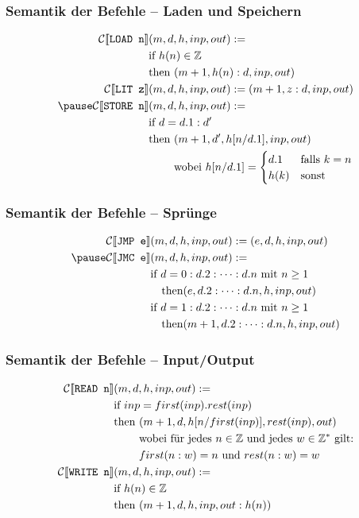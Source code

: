 \documentclass{beamer}
\begin{document}
\begin{frame} \frametitle{Semantik der Befehle -- Laden und Speichern}
	\small
	\begin{align*}
		\mathcal{C} [\![ \texttt{LOAD n} ]\!] &(m,d,h,inp,out) \defeq  \\
		&\text{if } h(n) \in \Z  \\
		&\text{then } (m+1, h(n) : d, inp, out) \\
		\mathcal{C} [\![ \texttt{LIT z} ]\!] &(m,d,h,inp,out) \defeq  (m+1, z : d, inp, out) \\ \pause
		\mathcal{C} [\![ \texttt{STORE n} ]\!] &(m,d,h,inp,out) \defeq  \\
		&\text{if } d = d.1 : d' \\
		&\text{then } (m+1, d', h[n/d.1], inp, out) \\
		&\phantom{\text{then }} \text{wobei } h[n/d.1] = \begin{cases} d.1 &\text{falls } k = n \\ h(k) &\text{sonst} \end{cases}
	\end{align*}
\end{frame}

\begin{frame} \frametitle{Semantik der Befehle -- Sprünge}
	\begin{align*}
		\mathcal{C} [\![ \texttt{JMP e} ]\!] &(m,d,h,inp,out) \defeq (e, d, h, inp, out) \\ \pause
		\mathcal{C} [\![ \texttt{JMC e} ]\!] &(m,d,h,inp,out) \defeq  \\
		&\text{if } d = 0 : d.2 : \dots : d.n \text{ mit } n \ge 1 \\
		&\quad\text{then} (e, d.2 : \dots : d.n, h, inp, out) \\
		&\text{if } d = 1 : d.2 : \dots : d.n \text{ mit } n \ge 1 \\
		&\quad\text{then} (m+1, d.2 : \dots : d.n, h, inp, out) 
	\end{align*}
\end{frame}

\begin{frame} \frametitle{Semantik der Befehle -- Input/Output}
	\begin{align*}
		\mathcal{C} [\![ \texttt{READ n} ]\!] &(m,d,h,inp,out) \defeq  \\
		&\text{if } inp = first(inp).rest(inp) \\
		&\text{then } (m+1, d, h[n/first(inp)], rest(inp), out) \\
		&\phantom{\text{then }} \text{wobei für jedes } n \in \Z \text{ und jedes } w \in \Z^\ast \text{ gilt:} \\
		&\phantom{\text{then }} first(n:w) = n \text{ und } rest(n:w) = w \\
		\mathcal{C} [\![ \texttt{WRITE n} ]\!] &(m,d,h,inp,out) \defeq  \\
		&\text{if } h(n) \in \Z \\
		&\text{then } (m+1, d, h, inp, out : h(n))
	\end{align*}
\end{frame}
\end{document}
